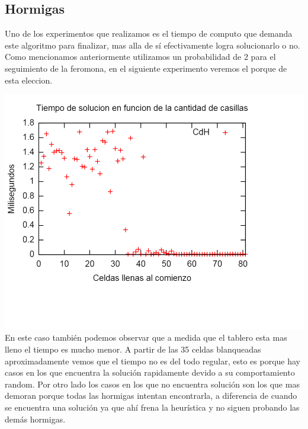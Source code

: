 \subsection{Hormigas}

Uno de los experimentos que realizamos es el tiempo de computo que demanda este algoritmo para finalizar, mas alla de sí efectivamente logra solucionarlo o no. Como mencionamos anteriormente utilizamos un probabilidad de 2 para el seguimiento de la feromona, en el siguiente experimento veremos el porque de esta eleccion.

\includegraphics[scale=0.5]{imgs/resultados_random_hormigas.png}	\\
En este caso también podemos observar que a medida que el tablero esta mas lleno el tiempo es mucho menor. A partir de las 35 celdas blanqueadas aproximadamente vemos que el tiempo no es del todo regular, esto es porque hay casos en los que encuentra la solución rapidamente devido a su comportamiento random. Por otro lado los casos en los que no encuentra solución son los que mas demoran porque todas las hormigas intentan encontrarla, a diferencia de cuando se encuentra una solución ya que ahí frena la heurística y no siguen probando las demás hormigas.


